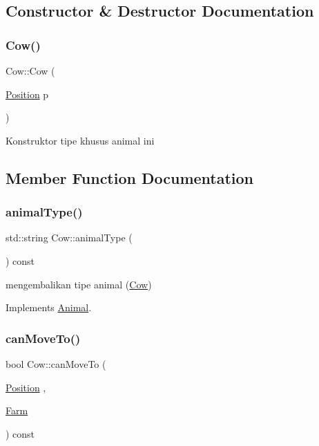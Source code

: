 \subsection{Constructor \& Destructor Documentation}
\mbox{\label{class_cow_a5bcc9eea19bf9d656e9e16148f1efaa9}} 
\subsubsection{\texorpdfstring{Cow()}{Cow()}}
{\footnotesize\ttfamily Cow\+::\+Cow (\begin{DoxyParamCaption}\item[{\mbox{\hyperlink{class_position}{Position}}}]{p }\end{DoxyParamCaption})}

Konstruktor tipe khusus animal ini 

\subsection{Member Function Documentation}
\mbox{\label{class_cow_a18d91d74f3b32a7ba9fc6c1db80c17df}} 
\subsubsection{\texorpdfstring{animalType()}{animalType()}}
{\footnotesize\ttfamily std\+::string Cow\+::animal\+Type (\begin{DoxyParamCaption}{ }\end{DoxyParamCaption}) const\hspace{0.3cm}{\ttfamily [virtual]}}

mengembalikan tipe animal (\mbox{\hyperlink{class_cow}{Cow}}) 

Implements \mbox{\hyperlink{class_animal_a1969cf8cf77a7900207420ae26f856e9}{Animal}}.

\mbox{\label{class_cow_a3fc59f29ac63abeacde61165ff1faf2a}} 
\subsubsection{\texorpdfstring{canMoveTo()}{canMoveTo()}}
{\footnotesize\ttfamily bool Cow\+::can\+Move\+To (\begin{DoxyParamCaption}\item[{\mbox{\hyperlink{class_position}{Position}}}]{,  }\item[{\mbox{\hyperlink{class_farm}{Farm}}}]{ }\end{DoxyParamCaption}) const\hspace{0.3cm}{\ttfamily [virtual]}}

